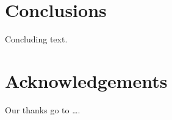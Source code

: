\documentclass[11pt,a4paper]{article}
\begin{document}
\section{Conclusions}

Concluding text.

\section{Acknowledgements}

Our thanks go to \ldots .



\end{document}
